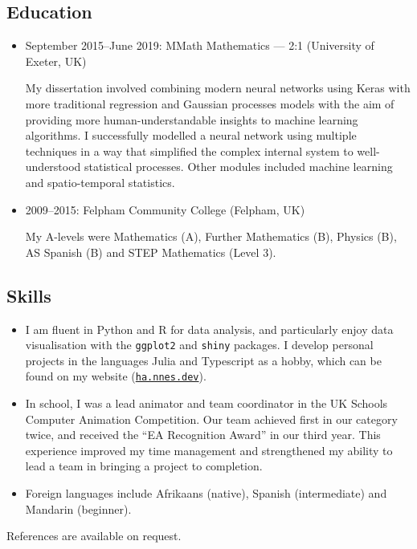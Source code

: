 \documentclass[11pt, a4paper]{article}
\begin{document}
\subsection*{Education}

\begin{itemize} 
	\item September 2015--June 2019: MMath Mathematics --- 2:1 (University of Exeter, UK)

	My dissertation involved combining modern neural networks using Keras with more traditional regression and Gaussian processes models with the aim of providing more human-understandable insights to machine learning algorithms.
	I successfully modelled a neural network using multiple techniques in a way that simplified the complex internal system to well-understood statistical processes.
	Other modules included machine learning and spatio-temporal statistics.

	\item 2009--2015: Felpham Community College (Felpham, UK)

	My A-levels were Mathematics (A), Further Mathematics (B), Physics (B), AS Spanish (B) and STEP Mathematics (Level 3).
\end{itemize}

\subsection*{Skills}

\begin{itemize}
	\item I am fluent in Python and R for data analysis, and particularly enjoy data visualisation with the \texttt{ggplot2} and \texttt{shiny} packages.
	I develop personal projects in the languages Julia and Typescript as a hobby, which can be found on my website (\href{https://ha.nnes.dev/}{\nolinkurl{ha.nnes.dev}}).

	\item In school, I was a lead animator and team coordinator in the UK Schools Computer Animation Competition.
	Our team achieved first in our category twice, and received the \enquote{EA Recognition Award} in our third year.
	This experience improved my time management and strengthened my ability to lead a team in bringing a project to completion.

	\item Foreign languages include Afrikaans (native), Spanish (intermediate) and Mandarin (beginner).
\end{itemize}

\noindent References are available on request.
\end{document}
